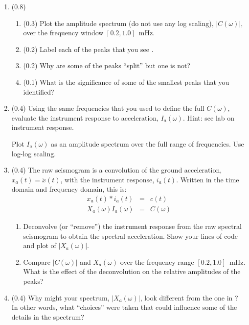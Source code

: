 \documentclass[11pt,titlepage,fleqn]{article}
\begin{document}
\begin{enumerate}

\item (0.8) 

\begin{enumerate}
\item (0.3) Plot the amplitude spectrum (do not use any log scaling), $|C(\omega)|$, over the frequency window $[0.2,1.0]$~mHz.
\item (0.2) Label each of the peaks that you see \citep[\eg][]{Park2005}.
\item (0.2) Why are some of the peaks ``split'' but one is not?
\item (0.1) What is the significance of some of the smallest peaks that you identified?
\end{enumerate}


\item (0.4) Using the same frequencies that you used to define the full $C(\omega)$, evaluate the instrument response to acceleration, $I_a(\omega)$. Hint: see lab on instrument response.

Plot $I_a(\omega)$ as an amplitude spectrum over the full range of frequencies. Use log-log scaling.


\item (0.4) The raw seismogram is a convolution of the ground acceleration, $x_a(t) = \ddot{x}(t)$, with the instrument response, $i_a(t)$. Written in the time domain and frequency domain, this is:
%
\begin{eqnarray}
x_a(t) * i_a(t) &=& c(t)
\\
X_a(\omega) I_a(\omega) &=& C(\omega)
\end{eqnarray}

\begin{enumerate}
\item Deconvolve (or ``remove'') the instrument response from the raw spectral seismogram to obtain the spectral acceleration. Show your lines of code and plot of $|X_a(\omega)|$.
\item Compare $|C(\omega)|$ and $X_a(\omega)$ over the frequency range $[0.2,1.0]$~mHz. What is the effect of the deconvolution on the relative amplitudes of the peaks?
\end{enumerate}


\item (0.4) Why might your spectrum, $|X_a(\omega)|$, look different from the one in \citet{Park2005}? In other words, what ``choices'' were taken that could influence some of the details in the spectrum?

\end{enumerate}
\end{document}
